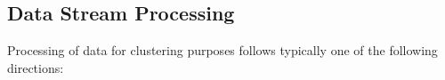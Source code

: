 \documentclass[../UNBThesis2.tex]{subfiles}
\begin{document}








\subsection{Data Stream Processing}
Processing of data for clustering purposes follows typically one of the following directions:
\end{document}
